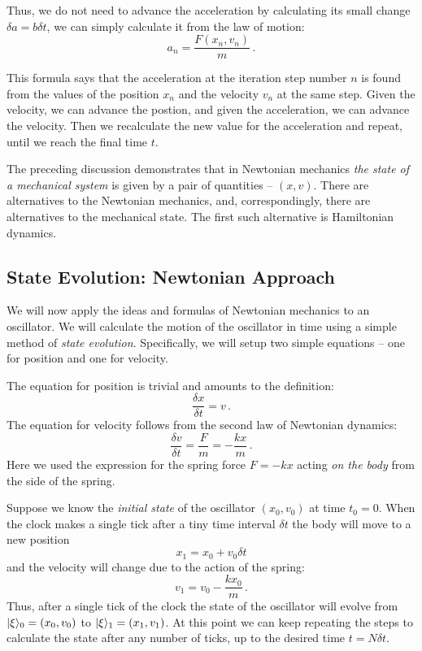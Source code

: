 Thus, we do not need to advance the acceleration by calculating its
small change $\delta a=b\delta t$, we can simply calculate it from
the law of motion:
\begin{equation}
	a_{n}=\frac{F(x_{n},v_{n})}{m}\,.
\end{equation}

This formula says that the acceleration at the iteration step number
$n$ is found from the values of the position $x_{n}$ and the velocity
$v_{n}$ at the same step. Given the velocity, we can advance the
postion, and given the acceleration, we can advance the velocity.
Then we recalculate the new value for the acceleration and repeat,
until we reach the final time $t$.

The preceding discussion demonstrates that in Newtonian mechanics
\emph{the state of a mechanical system} is given by a pair of quantities
-- $(x,v)$. There are alternatives to the Newtonian mechanics, and,
correspondingly, there are alternatives to the mechanical state. The
first such alternative is Hamiltonian dynamics.

\subsection{State Evolution: Newtonian Approach}
We will now apply the ideas and formulas of Newtonian mechanics to an
oscillator. We will calculate the motion of the oscillator in time
using a simple method of \emph{state evolution}. Specifically, we will
setup two simple equations -- one for position and one for velocity.

The equation for position is trivial and amounts to the definition:
\[
\frac{\delta x}{\delta t} = v\,.
\]
The equation for velocity follows from the second law of Newtonian
dynamics:
\[
\frac{\delta v}{\delta t} = \frac{F}{m} = -\frac{kx}{m}\,.
\]
Here we used the expression for the spring force $F=-kx$ acting
\emph{on the body} from the side of the spring.

Suppose we know the \emph{initial state} of the oscillator
$(x_0, v_0)$ at time $t_0=0$. When the clock makes a single tick after
a tiny time interval $\delta t$ the body will move to a new position
\[
x_1 = x_0 + v_0\delta t
\]
and the velocity will change due to the action of the spring:
\[
v_1 = v_0 -\frac{kx_0}{m}\,.
\]
Thus, after a single tick of the clock the state of the oscillator
will evolve from $|{\xi}\rangle_0=(x_0, v_0)$ to $|{\xi}\rangle_1=(x_1, v_1)$. At this point we can
keep repeating the steps to calculate the state after any number of
ticks, up to the desired time $t=N\delta t$.


